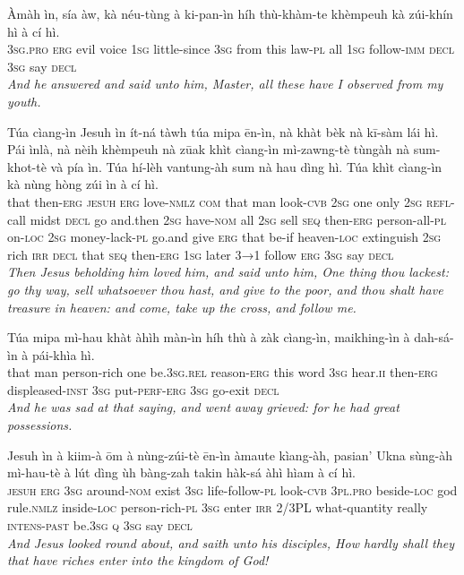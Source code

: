 \documentclass[11pt,a4paper]{article}
\begin{document}
\begin{exe}
\gll Àmàh ìn, sía àw, kà néu-tùng à ki-pan-ìn híh thù-khàm-te khèmpeuh kà zúi-khín hì à cí hì. \\
     \textsc{3sg}.\textsc{pro} \textsc{erg} evil voice \textsc{1sg} little-since \textsc{3sg} from this law-\textsc{pl} all \textsc{1sg} follow-\textsc{imm} \textsc{decl} \textsc{3sg} say \textsc{decl} \\
\glt \textcolor{kjvcolor}{\textit{And he answered and said unto him, Master, all these have I observed from my youth.}}

\gll Túa cìang-ìn Jesuh ìn ít-ná tàwh túa mipa ēn-ìn, nà khàt bèk nà kī-sàm lái hì. Pái ìnlà, nà nèih khèmpeuh nà zūak khìt cìang-ìn mì-zawng-tè tùngàh nà sum-khot-tè và pía ìn. Túa hí-lèh vantung-àh sum nà hau dìng hì. Túa khìt cìang-ìn kà nùng hòng zúi ìn à cí hì. \\
     that then-\textsc{erg} \textsc{jesuh} \textsc{erg} love-\textsc{nmlz} \textsc{com} that man look-\textsc{cvb} \textsc{2sg} one only \textsc{2sg} \textsc{refl}-call midst \textsc{decl} go and.then \textsc{2sg} have-\textsc{nom} all \textsc{2sg} sell \textsc{seq} then-\textsc{erg} person-all-\textsc{pl} on-\textsc{loc} \textsc{2sg} money-lack-\textsc{pl} go.and give \textsc{erg} that be-if heaven-\textsc{loc} extinguish \textsc{2sg} rich \textsc{irr} \textsc{decl} that \textsc{seq} then-\textsc{erg} \textsc{1sg} later \textsc{3→1} follow \textsc{erg} \textsc{3sg} say \textsc{decl} \\
\glt \textcolor{kjvcolor}{\textit{Then Jesus beholding him loved him, and said unto him, One thing thou lackest: go thy way, sell whatsoever thou hast, and give to the poor, and thou shalt have treasure in heaven: and come, take up the cross, and follow me.}}

\gll Túa mipa mì-hau khàt àhìh màn-ìn híh thù à zàk cìang-ìn, maikhing-ìn à dah-sá-ìn à pái-khìa hì. \\
     that man person-rich one be.\textsc{3sg}.\textsc{rel} reason-\textsc{erg} this word \textsc{3sg} hear.\textsc{ii} then-\textsc{erg} displeased-\textsc{inst} \textsc{3sg} put-\textsc{perf}-\textsc{erg} \textsc{3sg} go-exit \textsc{decl} \\
\glt \textcolor{kjvcolor}{\textit{And he was sad at that saying, and went away grieved: for he had great possessions.}}

\gll Jesuh ìn à kiim-à ōm à nùng-zúi-tè ēn-ìn àmaute kìang-àh, pasian' Ukna sùng-àh mì-hau-tè à lút dìng ùh bàng-zah takin hàk-sá àhì hìam à cí hì. \\
     \textsc{jesuh} \textsc{erg} \textsc{3sg} around-\textsc{nom} exist \textsc{3sg} life-follow-\textsc{pl} look-\textsc{cvb} \textsc{3pl}.\textsc{pro} beside-\textsc{loc} god rule.\textsc{nmlz} inside-\textsc{loc} person-rich-\textsc{pl} \textsc{3sg} enter \textsc{irr} 2/3PL what-quantity really \textsc{intens}-\textsc{past} be.\textsc{3sg} \textsc{q} \textsc{3sg} say \textsc{decl} \\
\glt \textcolor{kjvcolor}{\textit{And Jesus looked round about, and saith unto his disciples, How hardly shall they that have riches enter into the kingdom of God!}}


\end{exe}
\end{document}
